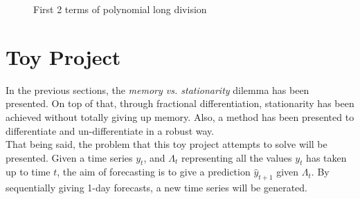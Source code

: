 \documentclass[a4paper]{article}
\begin{document}
\begin{figure}[htbp]
\centering
{}

\caption{First 2 terms of polynomial long division}
\label{fig:polyLongDiv}
\end{figure}

\section{Toy Project}
\label{sec:toyProjectFracDiff}
In the previous sections, the \textit{memory vs. stationarity} dilemma has 
been presented. On top of that, through fractional differentiation, 
stationarity has been achieved without totally giving up memory. Also, a 
method has been presented to differentiate and un-differentiate in a robust 
way.\\

That being said, the problem that this toy project attempts to solve will be 
presented. Given a time series $y_t$, and $\Lambda_t$ representing all the 
values $y_t$ has taken up to time $t$, the aim of forecasting is to give a 
prediction $\widehat{y}_{t + 1}$ given $\Lambda_t$. By sequentially giving 
1-day forecasts, a new time series will be generated.\\
\end{document}
